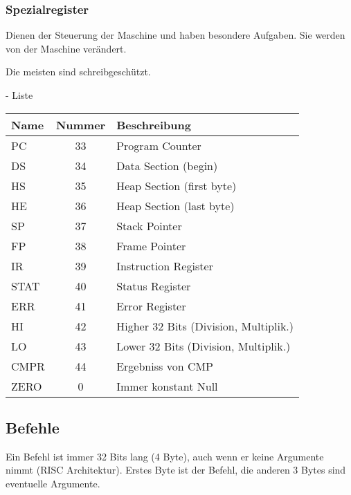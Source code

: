 \subsubsection{Spezialregister}

\begin{frame}{\insertsubsubsection}
 Dienen der Steuerung der Maschine und haben besondere Aufgaben. Sie werden von
 der Maschine verändert.
 
 Die meisten sind schreibgeschützt.
\end{frame}

\begin{frame}{\insertsubsubsection{} - Liste}
 \begin{tabular}{lcl}
Name  & Nummer & Beschreibung \\\toprule
PC    & 33     & Program Counter   \\ 
DS    & 34     & Data Section (begin)   \\ 
HS    & 35     & Heap Section (first byte)   \\ 
HE    & 36     & Heap Section (last byte)   \\ 
SP    & 37     & Stack Pointer   \\ 
FP    & 38     & Frame Pointer  \\ 
IR    & 39     & Instruction Register   \\ 
STAT  & 40     & Status Register   \\ 
ERR   & 41     & Error Register   \\ 
HI    & 42     & Higher 32 Bits (Division, Multiplik.)   \\ 
LO    & 43     & Lower 32 Bits (Division, Multiplik.)   \\ 
CMPR  & 44     & Ergebniss von CMP   \\ 
ZERO  & 0      & Immer konstant Null   \\\bottomrule
 \end{tabular}
\end{frame}




\subsection{Befehle}

\begin{frame}{\insertsubsection}
 Ein Befehl ist immer 32 Bits lang (4 Byte), auch wenn er keine Argumente nimmt
 (RISC Architektur).
 Erstes Byte ist der Befehl, die anderen 3 Bytes sind eventuelle Argumente.
 \begin{center}
  
 \end{center} 
\end{frame}



